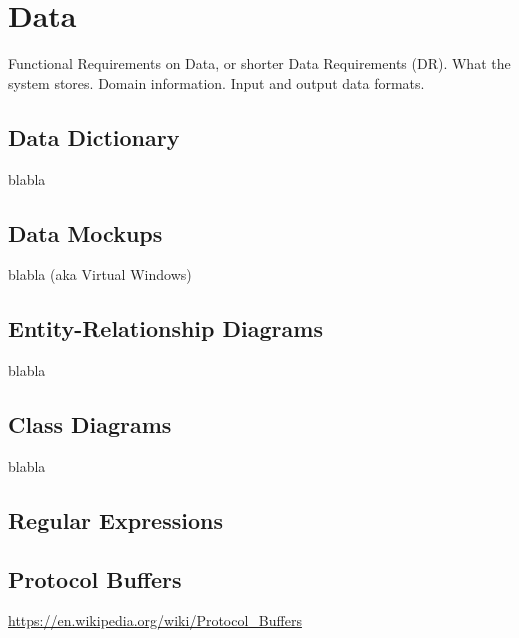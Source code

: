 
\chapter{Data}%

Functional Requirements on Data, or shorter Data Requirements (DR). What the system stores. Domain information. Input and output data formats.

\section{Data Dictionary}
blabla

\section{Data Mockups}
blabla  (aka Virtual Windows)


\section{Entity-Relationship Diagrams}
blabla

\section{Class Diagrams}
blabla



\section{Regular Expressions}

\section{Protocol Buffers}

\url{https://en.wikipedia.org/wiki/Protocol_Buffers}
